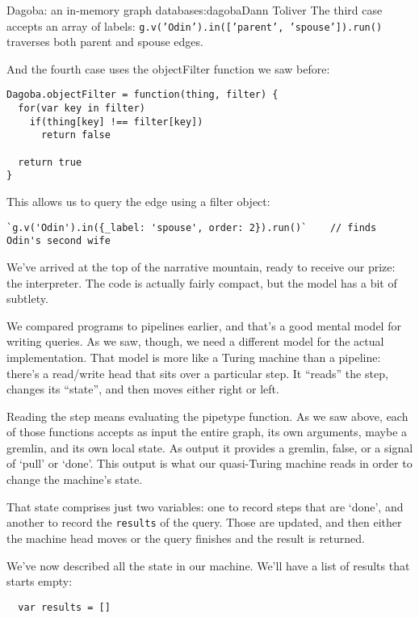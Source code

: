 \begin{aosachapter}{Dagoba: an in-memory graph database}{s:dagoba}{Dann Toliver}
The third case accepts an array of labels:
\texttt{g.v('Odin').in({[}'parent', 'spouse'{]}).run()} traverses both
parent and spouse edges.

And the fourth case uses the objectFilter function we saw before:

\begin{verbatim}
Dagoba.objectFilter = function(thing, filter) {
  for(var key in filter)
    if(thing[key] !== filter[key])
      return false

  return true
}
\end{verbatim}

This allows us to query the edge using a filter object:

\begin{verbatim}
`g.v('Odin').in({_label: 'spouse', order: 2}).run()`    // finds Odin's second wife
\end{verbatim}

\label{the-interpreters-nature}

We've arrived at the top of the narrative mountain, ready to receive our
prize: the interpreter. The code is actually fairly compact, but the
model has a bit of subtlety.

We compared programs to pipelines earlier, and that's a good mental
model for writing queries. As we saw, though, we need a different model
for the actual implementation. That model is more like a Turing machine
than a pipeline: there's a read/write head that sits over a particular
step. It ``reads'' the step, changes its ``state'', and then moves
either right or left.

Reading the step means evaluating the pipetype function. As we saw
above, each of those functions accepts as input the entire graph, its
own arguments, maybe a gremlin, and its own local state. As output it
provides a gremlin, false, or a signal of `pull' or `done'. This output
is what our quasi-Turing machine reads in order to change the machine's
state.

That state comprises just two variables: one to record steps that are
`done', and another to record the \texttt{results} of the query. Those
are updated, and then either the machine head moves or the query
finishes and the result is returned.

We've now described all the state in our machine. We'll have a list of
results that starts empty:

\begin{verbatim}
  var results = []
\end{verbatim}


\end{aosachapter}

